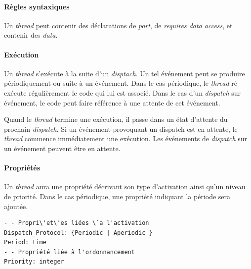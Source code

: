 \documentclass[11pt,a4paper]{paper}
\begin{document}
\begin{appendices}
\paragraph{Règles syntaxiques} Un {\em thread} peut contenir des déclarations de {\em port}, de {\em requires data access}, et contenir des {\em data}.

\paragraph{Exécution} Un {\em thread} s'exécute à la suite d'un {\em disptach}. Un tel événement peut se produire périodiquement ou suite à un événement. Dans le cas périodique, le {\em thread} ré-exécute régulièrement le code qui lui est associé. Dans le cas d'un {\em dispatch} sur événement, le code peut faire référence à une attente de cet événement.

Quand le {\em thread} termine une exécution, il passe dans un état d'attente du prochain {\em dispatch}. Si un événement provoquant un dispatch est en attente, le {\em thread} commence immédiatement une exécution. Les événements de {\em dispatch} sur un événement peuvent être en attente.

\paragraph{Propriétés} Un {\em thread} aura une propriété décrivant son type d'activation ainsi qu'un niveau de priorité. Dans le cas périodique, une propriété indiquant la période sera ajoutée.

\begin{center}
 \begin{minipage}[c]{.46\linewidth}
 \lstset{inputencoding=utf8/latin1}
\begin{lstlisting}
- - Propri\'et\'es liées \`a l'activation
Dispatch_Protocol: {Periodic | Aperiodic }
Period: time
- - Propriété liée à l'ordonnancement
Priority: integer
\end{lstlisting}
\end{minipage}
\end{center}


\end{appendices}
\end{document}
